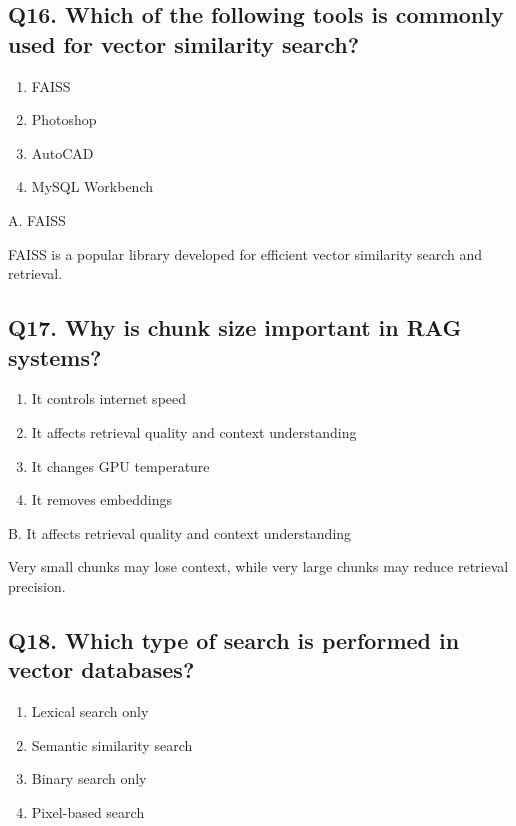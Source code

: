 \documentclass[12pt,a4paper]{article}
\begin{document}
\subsection*{Q16. Which of the following tools is commonly used for vector similarity search?}

\begin{enumerate}[label=\Alph*.]
\item FAISS
\item Photoshop
\item AutoCAD
\item MySQL Workbench
\end{enumerate}

\begin{tcolorbox}[colback=mid,colframe=softblue,title=Correct Answer]
A. FAISS

FAISS is a popular library developed for efficient vector similarity search and retrieval.
\end{tcolorbox}


\subsection*{Q17. Why is chunk size important in RAG systems?}

\begin{enumerate}[label=\Alph*.]
\item It controls internet speed
\item It affects retrieval quality and context understanding
\item It changes GPU temperature
\item It removes embeddings
\end{enumerate}

\begin{tcolorbox}[colback=mid,colframe=softblue,title=Correct Answer]
B. It affects retrieval quality and context understanding

Very small chunks may lose context, while very large chunks may reduce retrieval precision.
\end{tcolorbox}


\subsection*{Q18. Which type of search is performed in vector databases?}

\begin{enumerate}[label=\Alph*.]
\item Lexical search only
\item Semantic similarity search
\item Binary search only
\item Pixel-based search
\end{enumerate}
\end{document}
